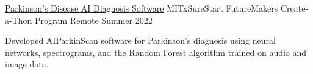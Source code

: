 \documentclass[10pt, letterpaper]{article}
\begin{document}
\begin{projectentry}
    {\href{https://github.com/agopalareddy/AIPS}{Parkinson's Disease AI Diagnosis Software}} %
    {MITxSureStart FutureMakers Create-a-Thon Program} %
    {Remote} %
    {Summer 2022} %
    \item Developed AIParkinScan software for Parkinson's diagnosis using neural networks, spectrograms, and the Random Forest algorithm trained on audio and image data.
\end{projectentry}

\end{document}
